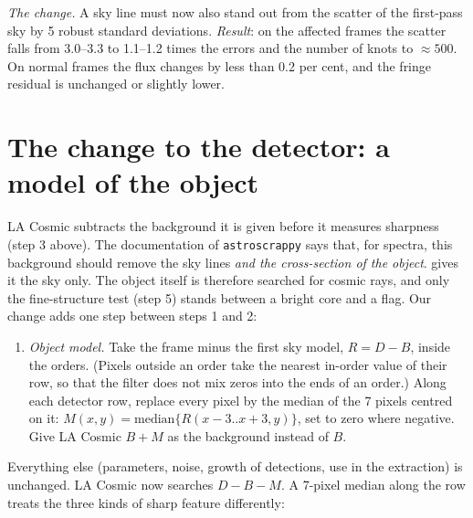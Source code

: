 \textit{The change.} A sky line must now also stand out from the scatter of the first-pass sky by 5 robust standard
deviations. \textit{Result}: on the affected frames the scatter falls from 3.0--3.3 to 1.1--1.2 times the errors and
the number of knots to $\approx500$. On normal frames the flux changes by less than 0.2 per cent, and the fringe
residual is unchanged or slightly lower.

\section{The change to the detector: a model of the object}
\label{sec:cr_model}
LA Cosmic subtracts the background it is given before it measures sharpness (step 3 above). The documentation of
\texttt{astroscrappy} says that, for spectra, this background should remove the sky lines \textit{and the
cross-section of the object}. \banzai{} gives it the sky only. The object itself is therefore searched for cosmic
rays, and only the fine-structure test (step 5) stands between a bright core and a flag. Our change adds one step
between steps 1 and 2:
\begin{enumerate}
\item[1a.] \textit{Object model.} Take the frame minus the first sky model, $R=D-B$, inside the orders. (Pixels outside
an order take the nearest in-order value of their row, so that the filter does not mix zeros into the ends of an
order.) Along each detector row, replace every pixel by the median of the 7 pixels centred on it:
$M(x,y)=\mathrm{median}\{R(x-3..x+3,y)\}$, set to zero where negative. Give LA Cosmic $B+M$ as the background instead
of $B$.
\end{enumerate}
Everything else (parameters, noise, growth of detections, use in the extraction) is unchanged. LA Cosmic now searches
$D-B-M$. A 7-pixel median along the row treats the three kinds of sharp feature differently:
